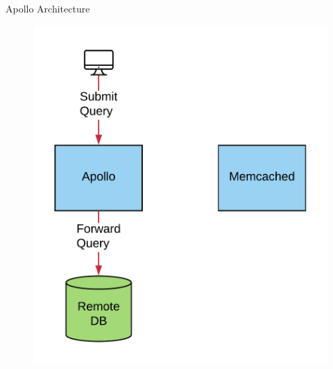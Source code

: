 \documentclass[10pt]{beamer}
\begin{document}
\begin{frame}[fragile]{Apollo Architecture}
    \begin{figure}
        \includegraphics[scale=0.17]{apollo_arch_diagram_4}
    \end{figure}
\end{frame}
\end{document}
